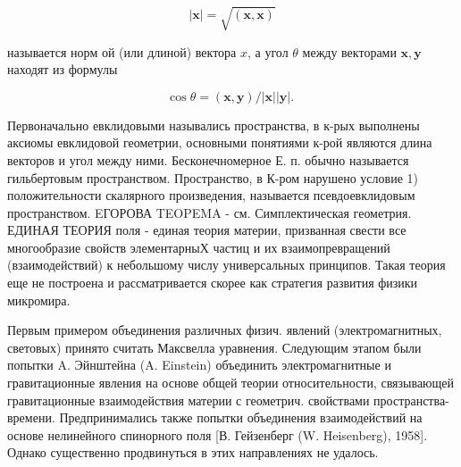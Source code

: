 \documentclass[10pt]{article}
\begin{document}
\[

|\boldsymbol{x}|=\sqrt{(\boldsymbol{x}, \boldsymbol{x})}

\]



называется норм ой (или длиной) вектора $x$, а угол $\theta$ между векторами $\boldsymbol{x}, \boldsymbol{y}$ находят из формулы



\[

\cos \theta=(\boldsymbol{x}, \boldsymbol{y}) /|\boldsymbol{x}||\boldsymbol{y}| \text {. }

\]



Первоначально евклидовыми назывались пространства, в к-рых выполнены аксиомы евклидовой геометрии, основными понятиями к-рой являются длина векторов и угол между ними. Бесконечномерное Е. п. обычно называется гильбертовым пространством. Пространство, в К-ром нарушено условие 1) положительности скалярного произведения, называется псевдоевклидовым пространством. EГОРОВА TEOPEMA - см. Симплектическая геометрия. ЕДИНАЯ ТЕОРИЯ поля - единая теория материи, призванная свести все многообразие свойств элементарныХ частиц и их взаимопревращений (взаимодействий) к небольшому числу универсальных принципов. Такая теория еще не построена и рассматривается скорее как стратегия развития физики микромира.



Первым примером объединения различных физич. явлений (электромагнитных, световых) принято считать Максвелла уравнения. Следующим этапом были попытки A. Эйнштейна (A. Einstein) объединить электромагнитные и гравитационные явления на основе общей теории относительности, связывающей гравитационные взаимодействия материи с геометрич. свойствами пространства-времени. Предпринимались также попытки объединения взаимодействий на основе нелинейного спинорного поля [В. Гейзенберг (W. Heisenberg), 1958]. Однако существенно продвинуться в этих направлениях не удалось.
\end{document}
